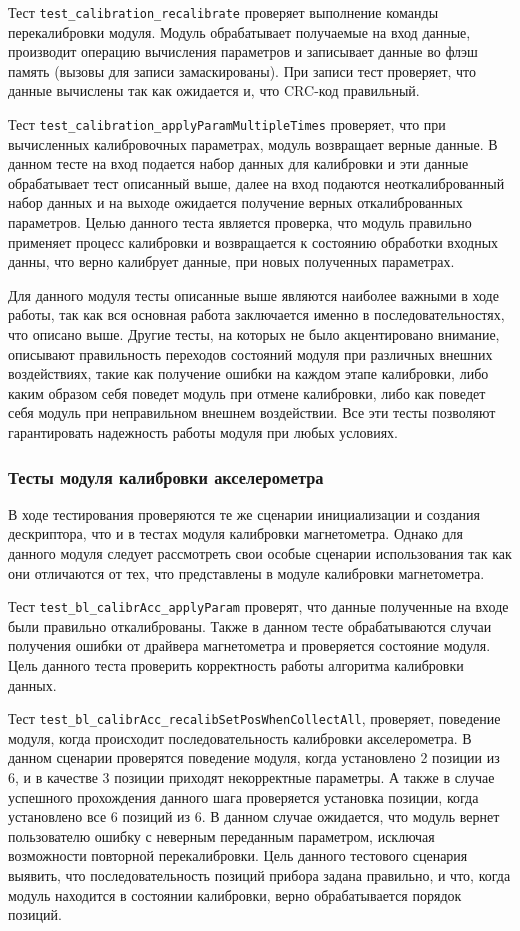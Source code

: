 Тест \lstinline|test_calibration_recalibrate| проверяет выполнение команды перекалибровки модуля. Модуль обрабатывает получаемые на вход данные,
производит операцию вычисления параметров и записывает данные во флэш память (вызовы для записи замаскированы). При записи тест проверяет, что данные
вычислены так как ожидается и, что CRC-код правильный.

Тест \lstinline|test_calibration_applyParamMultipleTimes| проверяет, что при вычисленных калибровочных параметрах, модуль возвращает верные данные. 
В данном тесте на вход подается набор данных для калибровки и эти данные обрабатывает тест описанный выше, далее на вход подаются неоткалиброванный набор данных
и на выходе ожидается получение верных откалиброванных параметров. 
Целью данного теста является проверка, что модуль правильно применяет процесс калибровки и возвращается к состоянию обработки входных данны, что верно калибрует
данные, при новых полученных параметрах.

Для данного модуля тесты описанные выше являются наиболее важными в ходе работы, так как вся основная работа заключается именно в последовательностях, что описано выше.
Другие тесты, на которых не было акцентировано внимание, описывают правильность переходов состояний модуля при различных внешних воздействиях, такие как получение ошибки
на каждом этапе калибровки, либо каким образом себя поведет модуль при отмене калибровки, либо как поведет себя модуль при неправильном внешнем воздействии. Все эти 
тесты позволяют гарантировать надежность работы модуля при любых условиях.

\subsubsection{Тесты модуля калибровки акселерометра}

В ходе тестирования проверяются те же сценарии инициализации и создания дескриптора, что и в тестах модуля калибровки магнетометра. Однако для данного модуля следует
рассмотреть свои особые сценарии использования так как они отличаются от тех, что представлены в модуле калибровки магнетометра.

Тест \lstinline|test_bl_calibrAcc_applyParam| проверят, что данные полученные на входе были правильно откалиброваны. 
Также в данном тесте обрабатываются случаи получения ошибки от драйвера магнетометра и проверяется состояние модуля. Цель данного теста проверить
корректность работы алгоритма калибровки данных.

Тест \lstinline|test_bl_calibrAcc_recalibSetPosWhenCollectAll|, проверяет, поведение модуля, когда происходит последовательность калибровки акселерометра.
В данном сценарии проверятся поведение модуля, когда установлено 2 позиции из 6, и в качестве 3 позиции приходят некорректные параметры. А также в случае успешного
прохождения данного шага проверяется установка позиции, когда установлено все 6 позиций из 6. В данном случае ожидается, что модуль вернет пользователю ошибку с неверным
переданным параметром, исключая возможности повторной перекалибровки. Цель данного тестового сценария выявить, что последовательность позиций прибора задана правильно, и что, когда
модуль находится в состоянии калибровки, верно обрабатывается порядок позиций.

